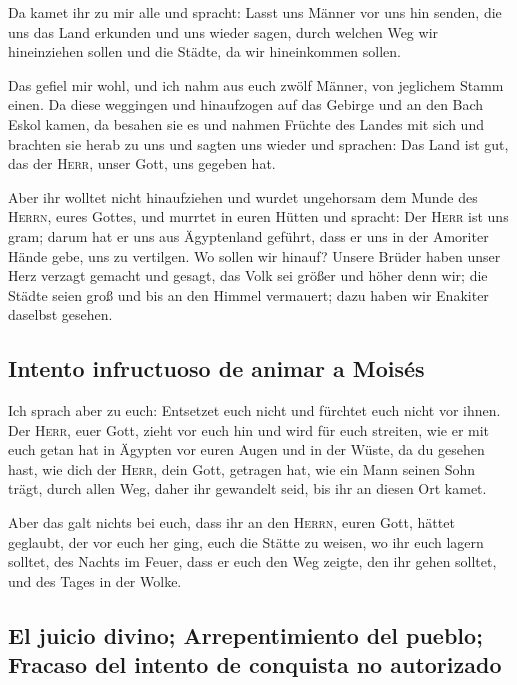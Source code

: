  Da kamet ihr zu mir alle und spracht: Lasst uns Männer
vor uns hin senden, die uns das Land erkunden und uns wieder sagen,
durch welchen Weg wir hineinziehen sollen und die Städte, da wir
hineinkommen sollen.

 Das gefiel mir wohl, und ich nahm aus euch zwölf Männer,
von jeglichem Stamm einen.  Da diese weggingen und
hinaufzogen auf das Gebirge und an den Bach Eskol kamen, da besahen sie
es  und nahmen Früchte des Landes mit sich und brachten
sie herab zu uns und sagten uns wieder und sprachen: Das Land ist gut,
das der \textsc{Herr}, unser Gott, uns gegeben hat.

 Aber ihr wolltet nicht hinaufziehen und wurdet
ungehorsam dem Munde des \textsc{Herrn}, eures Gottes, 
und murrtet in euren Hütten und spracht: Der \textsc{Herr} ist uns gram;
darum hat er uns aus Ägyptenland geführt, dass er uns in der Amoriter
Hände gebe, uns zu vertilgen.  Wo sollen wir hinauf?
Unsere Brüder haben unser Herz verzagt gemacht und gesagt, das Volk sei
größer und höher denn wir; die Städte seien groß und bis an den Himmel
vermauert; dazu haben wir Enakiter daselbst gesehen.

\hypertarget{intento-infructuoso-de-animar-a-moisuxe9s}{%
\subsection{Intento infructuoso de animar a
Moisés}\label{intento-infructuoso-de-animar-a-moisuxe9s}}

 Ich sprach aber zu euch: Entsetzet euch nicht und
fürchtet euch nicht vor ihnen.  Der \textsc{Herr}, euer
Gott, zieht vor euch hin und wird für euch streiten, wie er mit euch
getan hat in Ägypten vor euren Augen  und in der Wüste,
da du gesehen hast, wie dich der \textsc{Herr}, dein Gott, getragen hat,
wie ein Mann seinen Sohn trägt, durch allen Weg, daher ihr gewandelt
seid, bis ihr an diesen Ort kamet.

 Aber das galt nichts bei euch, dass ihr an den
\textsc{Herrn}, euren Gott, hättet geglaubt,  der vor
euch her ging, euch die Stätte zu weisen, wo ihr euch lagern solltet,
des Nachts im Feuer, dass er euch den Weg zeigte, den ihr gehen solltet,
und des Tages in der Wolke.

\hypertarget{el-juicio-divino-arrepentimiento-del-pueblo-fracaso-del-intento-de-conquista-no-autorizado}{%
\subsection{El juicio divino; Arrepentimiento del pueblo; Fracaso del
intento de conquista no
autorizado}\label{el-juicio-divino-arrepentimiento-del-pueblo-fracaso-del-intento-de-conquista-no-autorizado}}

